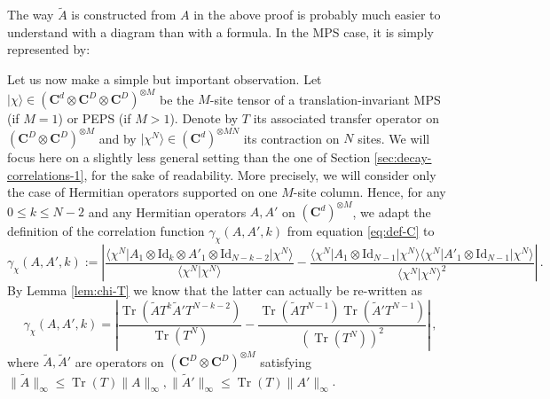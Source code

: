 \documentclass{amsart}
\newcommand{\C}{\mathbf{C}}
\renewcommand{\leq}{\leqslant}
\newcommand{\Id}{\mathrm{Id}}
\DeclareMathOperator{\Tr}{Tr}
\newcommand{\braket}[2]{\langle #1 | #2\rangle}
\newcommand{\bra}[1]{\langle #1 |}
\newcommand{\ket}[1]{| #1 \rangle}
\begin{document}
The way $\tilde{A}$ is constructed from $A$ in the above proof is probably much easier to understand with a diagram than with a formula. In the MPS case, it is simply represented by:
\begin{center}
\end{center}

Let us now make a simple but important observation. Let $\ket{\chi}\in(\C^d\otimes\C^D\otimes\C^D)^{\otimes M}$ be the $M$-site tensor of a translation-invariant MPS (if $M=1$) or PEPS (if $M>1$). Denote by $T$ its associated transfer operator on $(\C^D\otimes\C^D)^{\otimes M}$ and by $\ket{\chi^{N}}\in(\C^d)^{\otimes MN}$ its contraction on $N$ sites. We will focus here on a slightly less general setting than the one of Section \ref{sec:decay-correlations-1}, for the sake of readability. More precisely, we will consider only the case of Hermitian operators supported on one $M$-site column. Hence, for any $0\leq k\leq N-2$ and any Hermitian operators $A,A'$ on $(\C^d)^{\otimes M}$, we adapt the definition of the correlation function $\gamma_{\chi}(A,A',k)$ from equation \eqref{eq:def-C} to
\begin{equation*}
    \gamma_{\chi}(A,A',k) := \left| \frac{\bra{\chi^{N}}A_1\otimes\Id_k\otimes A'_1\otimes\Id_{N-k-2}\ket{\chi^{N}}}{\braket{\chi^{N}}{\chi^{N}}} - \frac{\bra{\chi^{N}}A_1\otimes\Id_{N-1}\ket{\chi^{N}}\bra{\chi^{N}}A'_1\otimes\Id_{N-1}\ket{\chi^{N}}}{\braket{\chi^{N}}{\chi^{N}}^2} \right| \, .
\end{equation*}
By Lemma \ref{lem:chi-T} we know that the latter can actually be re-written as
\[ \gamma_{\chi}(A,A',k) = \left| \frac{\Tr(\tilde{A}T^k\tilde{A}'T^{N-k-2})}{\Tr(T^N)} - \frac{\Tr(\tilde{A}T^{N-1})\Tr(\tilde{A}'T^{N-1})}{(\Tr(T^N))^2} \right| \, , \]
where $\tilde{A},\tilde{A}'$ are operators on $(\C^D\otimes\C^D)^{\otimes M}$ satisfying $\|\tilde{A}\|_{\infty}\leq\Tr(T)\|A\|_{\infty}, \|\tilde{A}'\|_{\infty}\leq\Tr(T)\|A'\|_{\infty}$.
\end{document}
